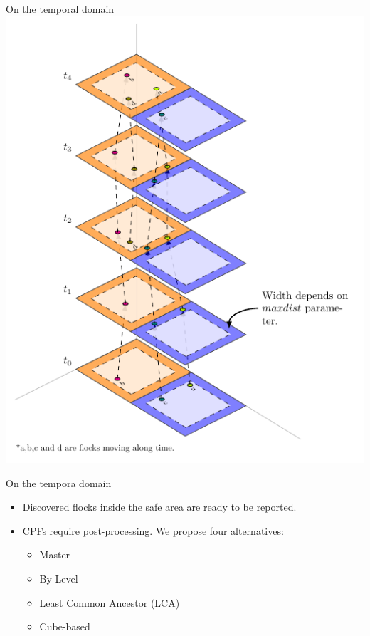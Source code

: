 \begin{frame}{On the temporal domain}
    \centering
    \includegraphics[height=0.9\textheight]{../thesis/chapterPFlocks/figures/plots/11_temporal_partitions/TemporalPartitioning}
\end{frame}

\begin{frame}{On the tempora domain}
    \begin{itemize}
        \item Discovered flocks inside the safe area are ready to be reported.
        \item CPFs require post-processing.  We propose four alternatives:
        \begin{itemize}
            \item Master
            \item By-Level
            \item Least Common Ancestor (LCA)
            \item Cube-based
        \end{itemize}
    \end{itemize}
\end{frame}

